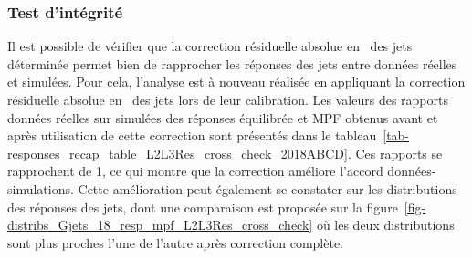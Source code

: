 \subsubsection{Test d'intégrité}\label{chapter-JERC-section-JES-subsec-results-subsubsec-L2L3Res_cross_check}
Il est possible de vérifier que la correction résiduelle absolue en \pT\ des jets déterminée permet bien de rapprocher les réponses des jets entre données réelles et simulées.
Pour cela, l'analyse est à nouveau réalisée en appliquant la correction résiduelle absolue en \pT\ des jets lors de leur calibration.
Les valeurs des rapports données réelles sur simulées des réponses équilibrée et MPF obtenus avant et après utilisation de cette correction sont présentés dans le tableau~\ref{tab-responses_recap_table_L2L3Res_cross_check_2018ABCD}. Ces rapports se rapprochent de \num{1}, ce qui montre que la correction améliore l'accord données-simulations.
Cette amélioration peut également se constater sur les distributions des réponses des jets, dont une comparaison est proposée sur la figure~\ref{fig-distribs_Gjets_18_resp_mpf_L2L3Res_cross_check} où les deux distributions sont plus proches l'une de l'autre après correction complète.
